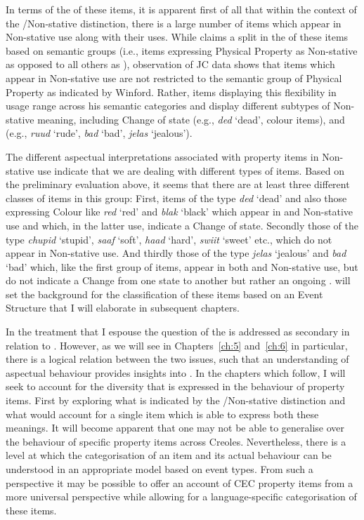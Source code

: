 In terms of the  of these items, it is apparent first
of all that within the context of the \slash Non-stative distinction,
there is a large number of items which appear in Non-stative use along
with their  uses.  While \citet{Winford1993} claims a split in
the  of these items based on semantic groups (i.e.,
items expressing Physical Property as Non-stative as opposed to all
others as ), observation of JC data shows that items which appear in Non-stative use are not restricted to the semantic group of
Physical Property as indicated by Winford.  Rather, items displaying
this flexibility in usage range across his semantic categories and
display different subtypes of Non-stative meaning, including Change of
state (e.g., \textit{ded} `dead', colour items), and  (e.g.,
\textit{ruud} `rude', \textit{bad} `bad', \textit{jelas} `jealous').


The different aspectual interpretations associated with property items
in Non-stative use indicate that we are dealing with different types
of items.  Based on the preliminary evaluation above, it seems that
there are at least three different classes of items in this group:
First, items of the type \textit{ded}  `dead' and also those expressing
Colour like \textit{red} `red' and {\textit{blak}} `black' which appear in  and Non-stative use and which, in the latter use, indicate a 
Change of state.  Secondly those of the type \textit{chupid} `stupid',
\textit{saaf} `soft', \textit{haad} `hard', \textit{swiit} `sweet'
etc., which do not appear in Non-stative use.  And thirdly those of the
type \textit{jelas} `jealous' and \textit{bad} `bad' which, like the
first group of items, appear in both  and Non-stative use, but
do not indicate a Change from one state to another but rather an
ongoing .   will set the background for the
classification of these items based on an Event Structure that I will
elaborate in subsequent chapters.

In the treatment that I espouse the question of the 
is addressed as secondary in relation to . However, as
we will see in Chapters~\ref{ch:5} and~\ref{ch:6} in particular, there is a logical
relation between the two issues, such that an understanding of
aspectual behaviour provides insights into . In the
chapters which follow, I will seek to account for the diversity that
is expressed in the behaviour of property items.  First by exploring
what is indicated by the \slash Non-stative distinction and what
would account for a single item which is able to express both these
meanings.  It will become apparent that one may not be able to
generalise over the behaviour of specific property items across
Creoles.  Nevertheless, there is a level at which the categorisation
of an item and its actual behaviour can be understood in an
appropriate model based on event types.  From such a perspective it
may be possible to offer an account of CEC property items from a more
universal perspective while allowing for a language-specific
categorisation of these items.
